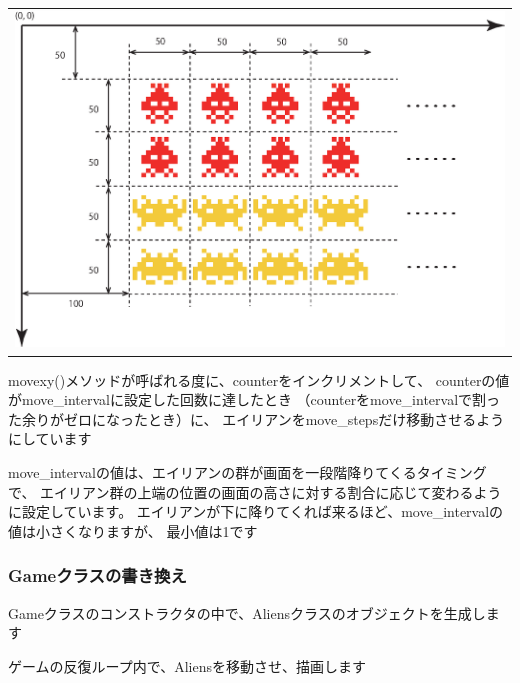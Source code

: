 \documentclass[uplatex,a4paper,11pt,oneside,openany]{jsbook}
\begin{document}
\begin{table}[htb]
\begin{center}
    \begin{tabular}{c}
    \includegraphics[width=0.7\hsize]{figures/eps/aliens.eps}
  \end{tabular}
\end{center}
\end{table}

movexy()メソッドが呼ばれる度に、counterをインクリメントして、
counterの値がmove\_intervalに設定した回数に達したとき
（counterをmove\_intervalで割った余りがゼロになったとき）に、
エイリアンをmove\_stepsだけ移動させるようにしています

move\_intervalの値は、エイリアンの群が画面を一段階降りてくるタイミングで、
エイリアン群の上端の位置の画面の高さに対する割合に応じて変わるように設定しています。
エイリアンが下に降りてくれば来るほど、move\_intervalの値は小さくなりますが、
最小値は1です

\subsubsection{Gameクラスの書き換え}

Gameクラスのコンストラクタの中で、Aliensクラスのオブジェクトを生成します

ゲームの反復ループ内で、Aliensを移動させ、描画します
\end{document}
